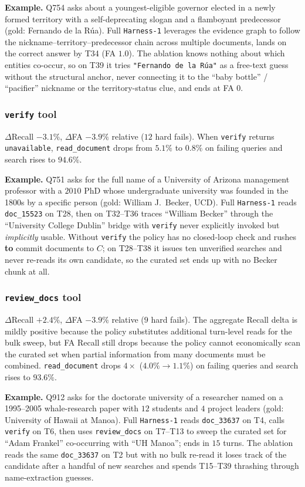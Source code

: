 \documentclass{article}
\newcommand{\sys}{\texttt{Harness-1}\xspace}
\newcommand{\verify}{\texttt{verify}\xspace}
\begin{document}
\textbf{Example.} Q754 asks about a youngest-eligible governor
elected in a newly formed territory with a self-deprecating
slogan and a flamboyant predecessor (gold: Fernando de la R\'ua).
Full \sys leverages the evidence graph to follow the
nickname--territory--predecessor chain across multiple
documents, lands on the correct answer by T34 (FA $1.0$). The
ablation knows nothing about which entities co-occur, so on T39
it tries \texttt{"Fernando de la R\'ua"} as a free-text guess
without the structural anchor, never connecting it to the
``baby bottle'' / ``pacifier'' nickname or the territory-status
clue, and ends at FA $0$.

\subsubsection{\texttt{verify} tool}
\label{app:err:verify}
$\Delta$Recall $-3.1\%$, $\Delta$FA $-3.9\%$ relative
($12$ hard fails).
When \verify returns \texttt{unavailable},
\texttt{read\_document} drops from $5.1\%$ to $0.8\%$ on failing
queries and search rises to $94.6\%$.

\textbf{Example.} Q751 asks for the full name of a University of
Arizona management professor with a $2010$ PhD whose
undergraduate university was founded in the 1800s by a specific
person (gold: William J.\ Becker, UCD). Full \sys reads
\texttt{doc\_15523} on T28, then on T32--T36 traces ``William
Becker'' through the ``University College Dublin'' bridge with
\verify never explicitly invoked but \emph{implicitly} usable.
Without \verify the policy has no closed-loop check and rushes
\textbf{to} commit documents to $C$; on T28--T38 it issues ten
unverified searches and never re-reads its own candidate, so
the curated set ends up with no Becker chunk at all.

\subsubsection{\texttt{review\_docs} tool}
\label{app:err:review-docs}
$\Delta$Recall $+2.4\%$, $\Delta$FA $-3.9\%$ relative
($9$ hard fails).
The aggregate Recall delta is mildly positive because the policy
substitutes additional turn-level reads for the bulk sweep, but
FA Recall still drops because the policy cannot economically
scan the curated set when partial information from many
documents must be combined. \texttt{read\_document} drops
$4\times$ ($4.0\%{\to}1.1\%$) on failing queries and search
rises to $93.6\%$.

\textbf{Example.} Q912 asks for the doctorate university of a
researcher named on a 1995--2005 whale-research paper with $12$
students and $4$ project leaders (gold: University of Hawai\textquotesingle i
at Manoa). Full \sys reads \texttt{doc\_33637} on T4, calls
\verify on T6, then uses \texttt{review\_docs} on T7--T13 to
sweep the curated set for ``Adam Frankel'' co-occurring with
``UH Manoa''; ends in $15$ turns. The ablation reads the same
\texttt{doc\_33637} on T2 but with no bulk re-read it loses
track of the candidate after a handful of new searches and
spends T15--T39 thrashing through name-extraction guesses.
\end{document}
